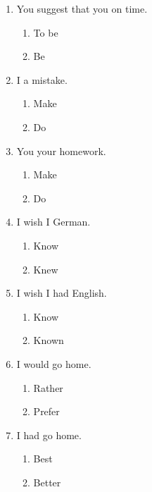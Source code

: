 \documentclass[11pt,a4paper]{article}
\begin{document}
\begin{enumerate}
    \item You suggest that you \underline{\hspace{2cm}} on time.
    \begin{enumerate}[label=\alph*.] \item To be \item Be \end{enumerate}

    \item I \underline{\hspace{2cm}} a mistake.
    \begin{enumerate}[label=\alph*.] \item Make \item Do \end{enumerate}

    \item You \underline{\hspace{2cm}} your homework.
    \begin{enumerate}[label=\alph*.] \item Make \item Do \end{enumerate}

    \item I wish I \underline{\hspace{2cm}} German.
    \begin{enumerate}[label=\alph*.] \item Know \item Knew \end{enumerate}

    \item I wish I had \underline{\hspace{2cm}} English.
    \begin{enumerate}[label=\alph*.] \item Know \item Known \end{enumerate}

    \item I would \underline{\hspace{2cm}} go home.
    \begin{enumerate}[label=\alph*.] \item Rather \item Prefer \end{enumerate}

    \item I had \underline{\hspace{2cm}} go home.
    \begin{enumerate}[label=\alph*.] \item Best \item Better \end{enumerate}


\end{enumerate}
\end{document}
